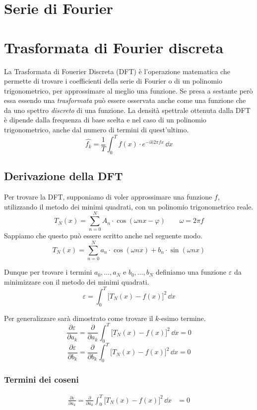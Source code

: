 \section{Serie di Fourier}

\section{Trasformata di Fourier discreta}
La Trasformata di Fouerier Discreta (DFT) \`e l'operazione matematica che
permette di trovare i coefficienti della serie di Fourier o di un polinomio
trigonometrico, per approssimare al meglio una funzione. Se presa a sestante
per\`o essa essendo una \emph{trasformata} pu\`o essere osservata anche come
una funzione che da uno spettro \emph{discreto} di una funzione. La densit\`a
spettrale ottenuta dalla DFT \`e dipende dalla frequenza di base scelta e nel
caso di un polinomio trigonometrico, anche dal numero di termini di
quest'ultimo.
\[
    \hat{f_k} = \frac{1}{T}\int_0^T f(x)\cdot e^{-ik2\pi fx}\,\dd{x}
\]

\subsection{Derivazione della DFT}
Per trovare la DFT, supponiamo di voler approssimare una funzione \(f\),
utilizzando il metodo dei minimi quadrati, con un polinomio trigonometrico
reale.
\[
    T_N(x) =  \sum_{n=0}^N A_n\cdot\cos(\omega nx -\varphi) \qquad \omega=2\pi f
\]
Sappiamo che questo pu\`o essere scritto anche nel seguente modo.
\[
    T_N(x) =  \sum_{n=0}^N a_n\cdot\cos(\omega nx)  + b_n\cdot\sin(\omega nx)
\]

Dunque per trovare i termini \(a_0,\dots,a_N\) e \(b_0,\dots,b_N\) definiamo
una funzione \(\varepsilon\) da minimizzare con il metodo dei minimi quadrati.
\[
    \varepsilon = \int_0^T\big[T_N(x) - f(x)\big]^2\,\dd{x}
\]

Per generalizzare sar\`a dimostrato come trovare il \(k\)-esimo termine.
\[
    \frac{\partial\varepsilon}{\partial a_k} =
    \frac{\partial}{\partial a_k} \int_0^T\big[T_N(x) - f(x)\big]^2\,\dd{x}
    = 0
\]
\[
    \frac{\partial\varepsilon}{\partial b_k} =
    \frac{\partial}{\partial b_k} \int_0^T\big[T_N(x) - f(x)\big]^2\,\dd{x}
    = 0
\]

\subsubsection{Termini dei coseni}
\begin{align*}
    \frac{\partial\varepsilon}{\partial a_k} =
    \frac{\partial}{\partial a_k} \int_0^T\big[T_N(x) - f(x)\big]^2\,\dd{x}
    &= 0 \\
\end{align*}
